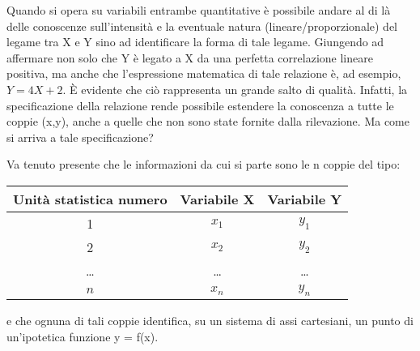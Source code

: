  Quando si opera su variabili entrambe quantitative è possibile andare al 
di là delle conoscenze sull'intensità e la eventuale natura 
(lineare/proporzionale) del legame tra X e Y sino ad identificare la forma 
di tale legame. Giungendo ad affermare non solo che Y è legato a X da una 
perfetta correlazione lineare positiva, ma anche che l'espressione 
matematica di tale relazione è, ad esempio, \(Y=4 X +2\).
 È evidente che ciò rappresenta un grande salto di qualità. Infatti, la 
specificazione della relazione rende possibile estendere la conoscenza a 
tutte le coppie (x,y), anche a quelle che non sono state fornite dalla 
rilevazione.
 Ma come si arriva a tale specificazione?
 
 Va tenuto presente che le informazioni da cui si parte sono 
le n coppie del tipo:

\begin{center}
 \begin{tabular}{|c|c|c|}
        \hline
        Unità statistica numero &       Variabile X&    Variabile Y\\\hline
        1&      \(x_1\)&  \(y_1\)\\\hline
        2&      \(x_2\)&  \(y_2\)\\\hline
        \dots&  \dots&\dots\\\hline
        \(n\)&    \(x_n\)&  \(y_n\)\\\hline
 \end{tabular}
\end{center}
 
\vspace{6pt}
 e che ognuna di tali coppie identifica, su un sistema di assi cartesiani, 
un punto di un'ipotetica funzione y = f(x).
 
